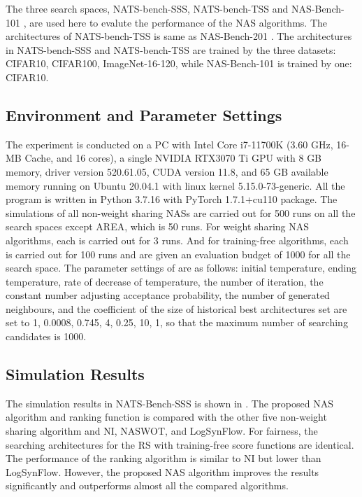 \documentclass[sigconf]{acmart}
\begin{document}
    The three search spaces, NATS-bench-SSS, NATS-bench-TSS 
    \cite{Dong_2021} and NAS-Bench-101 \cite{ying2019nasbench101}, are used 
    here to evalute the performance of the NAS algorithms. The architectures 
    of NATS-bench-TSS is same as NAS-Bench-201 \cite{dong2020nasbench201}. 
    The architectures in NATS-bench-SSS and NATS-bench-TSS are trained by the three datasets: 
    CIFAR10, CIFAR100, ImageNet-16-120, while NAS-Bench-101 is trained by one: 
    CIFAR10. 

    \subsection{Environment and Parameter Settings}
    The experiment is conducted on a PC with Intel Core i7-11700K (3.60 GHz, 16-MB Cache, and 16 cores), 
    a single NVIDIA RTX3070 Ti GPU with 8 GB memory, driver version 520.61.05, CUDA version 11.8, and 
    65 GB available memory running on Ubuntu 20.04.1 with linux kernel 5.15.0-73-generic. All the program 
    is written in Python 3.7.16 with PyTorch 1.7.1+cu110 package. The simulations of all 
    non-weight sharing NASs are carried out for 500 runs on all the search spaces except AREA, which is 50 runs. 
    For weight sharing NAS algorithms, each is carried out for 3 runs. And for training-free 
    algorithms, each is carried out for 100 runs and are given an evaluation 
    budget of 1000 for all the search space. The parameter settings of \palg{} are as follows: 
    initial temperature, ending temperature, rate of decrease of temperature, the number of iteration, 
    the constant number adjusting acceptance probability, the number of generated neighbours, and 
    the coefficient of the size of historical best architectures set are set 
    to 1, 0.0008, 0.745, 4, 0.25, 10, 1, so that the maximum number of searching candidates is 1000. 

    \subsection{Simulation Results}
    The simulation results in NATS-Bench-SSS \cite{Dong_2021} is shown in . The proposed 
    NAS algorithm and ranking function is compared with the other five non-weight sharing 
    algorithm and NI, NASWOT, and LogSynFlow. 
    For fairness, the searching architectures for the RS with training-free score 
    functions are identical. The performance of the ranking algorithm is similar to NI but 
    lower than LogSynFlow. However, the proposed NAS algorithm improves the results 
    significantly and outperforms almost all the compared algorithms. 
\end{document}
